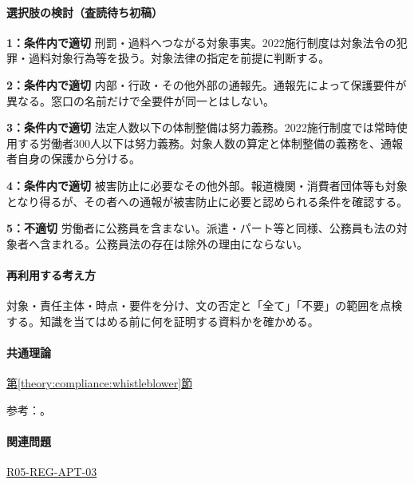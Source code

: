 \paragraph{選択肢の検討（査読待ち初稿）}\mbox{}\par

\noindent\textbf{1：条件内で適切} 刑罰・過料へつながる対象事実。2022施行制度は対象法令の犯罪・過料対象行為等を扱う。対象法律の指定を前提に判断する。\par

\noindent\textbf{2：条件内で適切} 内部・行政・その他外部の通報先。通報先によって保護要件が異なる。窓口の名前だけで全要件が同一とはしない。\par

\noindent\textbf{3：条件内で適切} 法定人数以下の体制整備は努力義務。2022施行制度では常時使用する労働者300人以下は努力義務。対象人数の算定と体制整備の義務を、通報者自身の保護から分ける。\par

\noindent\textbf{4：条件内で適切} 被害防止に必要なその他外部。報道機関・消費者団体等も対象となり得るが、その者への通報が被害防止に必要と認められる条件を確認する。\par

\noindent\textbf{5：不適切} 労働者に公務員を含まない。派遣・パート等と同様、公務員も法の対象者へ含まれる。公務員法の存在は除外の理由にならない。\par

\paragraph{再利用する考え方} 対象・責任主体・時点・要件を分け、文の否定と「全て」「不要」の範囲を点検する。知識を当てはめる前に何を証明する資料かを確かめる。

\paragraph{共通理論} \hyperref[theory:compliance:whistleblower]{第\ref*{theory:compliance:whistleblower}節}

\par 参考：\cite{caa_amend2020,caa_current_faq,saf53_whistle_oldpublic}。

\paragraph{関連問題} \hyperref[q:r05-reg-apt-03]{R05-REG-APT-03}

